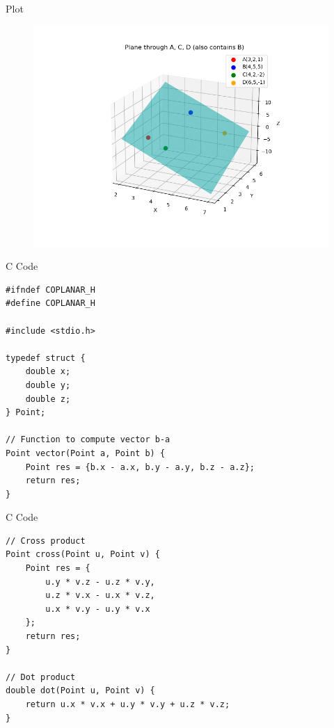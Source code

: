 \documentclass{beamer}
\begin{document}
\begin{frame}{Plot}
    \begin{figure}
        \centering
        \includegraphics[width=1\linewidth]{figs/plot7.png}
        \caption{}
        \label{fig:placeholder}
    \end{figure}
\end{frame}

\begin{frame}[fragile]{C Code}
    \begin{verbatim}
#ifndef COPLANAR_H
#define COPLANAR_H

#include <stdio.h>

typedef struct {
    double x;
    double y;
    double z;
} Point;

// Function to compute vector b-a
Point vector(Point a, Point b) {
    Point res = {b.x - a.x, b.y - a.y, b.z - a.z};
    return res;
}
    \end{verbatim}
\end{frame}

\begin{frame}[fragile]{C Code}
    \begin{verbatim}
// Cross product
Point cross(Point u, Point v) {
    Point res = {
        u.y * v.z - u.z * v.y,
        u.z * v.x - u.x * v.z,
        u.x * v.y - u.y * v.x
    };
    return res;
}

// Dot product
double dot(Point u, Point v) {
    return u.x * v.x + u.y * v.y + u.z * v.z;
}
    \end{verbatim}
\end{frame}
\end{document}
